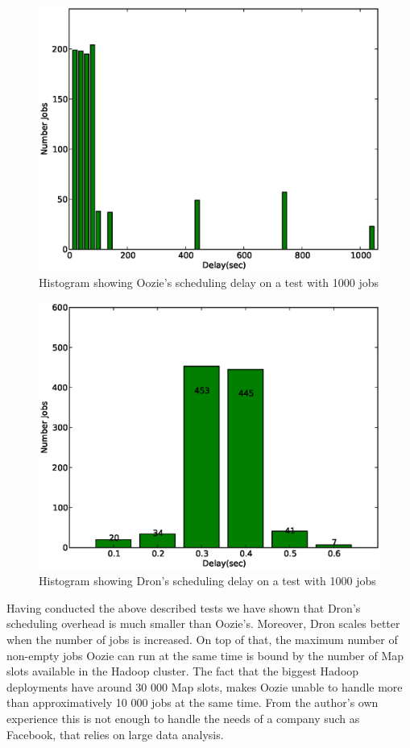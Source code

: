 \documentclass[11pt,a4paper,twoside]{report}
\begin{document}
\begin{figure}[h]
\centering
\includegraphics[scale=0.50]{ooziedelaybig}
\caption{Histogram showing Oozie's scheduling delay on a test with 1000 jobs}
\label{fig:OozieDelayBig}
\end{figure}


\begin{figure}[h]
\centering
\includegraphics[scale=0.50]{drondelaybig}
\caption{Histogram showing Dron's scheduling delay on a test with 1000 jobs}
\label{fig:DronDelayBig}
\end{figure}


Having conducted the above described tests we have shown that Dron's scheduling overhead is much smaller than Oozie's. Moreover, Dron scales better when the number of jobs is increased. On top of that, the maximum number of non-empty jobs Oozie can run at the same time is bound by the number of Map slots available in the Hadoop cluster. The fact that the biggest Hadoop deployments have around 30 000 Map slots, makes Oozie unable to handle more than approximatively 10 000 jobs at the same time. From the author's own experience this is not enough to handle the needs of a company such as Facebook, that relies on large data analysis.
\end{document}
